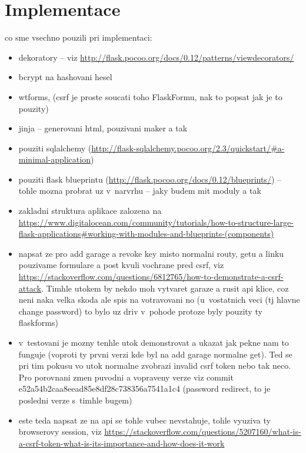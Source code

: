 \chapter{Implementace}
\label{sec:im}

co sme vsechno pouzili pri implementaci:

\begin{itemize}

\item dekoratory -- viz \url{http://flask.pocoo.org/docs/0.12/patterns/viewdecorators/}

\item bcrypt na hashovani hesel

\item wtforms, (csrf je proste soucati toho FlaskFormu, nak to popsat jak je to pouzity)

\item jinja -- generovani html, pouzivani maker a tak

\item pouziti sqlalchemy (\url{http://flask-sqlalchemy.pocoo.org/2.3/quickstart/#a-minimal-application})

\item pouziti flask blueprintu (\url{http://flask.pocoo.org/docs/0.12/blueprints/}) -- tohle mozna probrat uz v~narvrhu -- jaky budem mit moduly a tak

\item zakladni struktura aplikace zalozena na \url{https://www.digitalocean.com/community/tutorials/how-to-structure-large-flask-applications#working-with-modules-and-blueprints-(components)}

\item napsat ze pro add garage a revoke key misto normalni routy, getu a linku pouzivame formulare a post kvuli vochrane pred csrf, viz \url{https://stackoverflow.com/questions/6812765/how-to-demonstrate-a-csrf-attack}. Timhle utokem by nekdo moh vytvaret garaze a rusit api klice, coz neni naka velka skoda ale spis na votravovani no (u~vostatnich veci (tj hlavne change password) to bylo uz driv v~pohode protoze byly pouzity ty flaskforms)

\item v~testovani je mozny tenhle utok demonstrovat a ukazat jak pekne nam to funguje (voproti ty prvni verzi kde byl na add garage normalne get). Ted se pri tim pokusu vo utok normalne zvobrazi invalid csrf token nebo tak neco. Pro porovnani zmen puvodni a vopraveny verze viz commit e52a54b2caa8eead85e8df28c738356a7541a1c4 (password redirect, to je posledni verze s~timhle bugem)

\item este teda napsat ze na api se tohle vubec nevstahuje, tohle vyuziva ty browserovy session, viz \url{https://stackoverflow.com/questions/5207160/what-is-a-csrf-token-what-is-its-importance-and-how-does-it-work}

\end{itemize}

